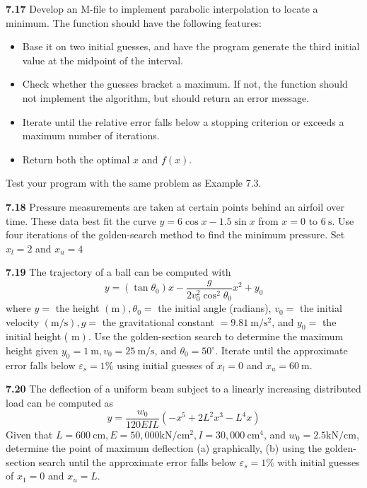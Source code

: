 \documentclass[../main.tex]{subfiles}
\begin{document}
\begin{multicols}{2}
	\noindent \textbf{7.17} Develop an M-file to implement parabolic interpolation to locate a minimum. The function should have the following features:
	\begin{itemize}
		\item Base it on two initial guesses, and have the program generate the third initial value at the midpoint of the interval.
		\item Check whether the guesses bracket a maximum. If not, the function should not implement the algorithm, but should return an error message.
		\item Iterate until the relative error falls below a stopping criterion or exceeds a maximum number of iterations.	
		\item Return both the optimal $x$ and $f(x)$.
	\end{itemize}
	
	\noindent Test your program with the same problem as Example 7.3.
	
	\noindent \textbf{7.18} Pressure measurements are taken at certain points behind an airfoil over time. These data best fit the curve $y=6 \cos x-1.5 \sin x$ from $x=0$ to $6 \mathrm{~s}$. Use four iterations of the golden-search method to find the minimum pressure. Set $x_{l}=2$ and $x_{u}=4$
	
	\noindent \textbf{7.19} The trajectory of a ball can be computed with
	$$
	y=\left(\tan \theta_{0}\right) x-\frac{g}{2 v_{0}^{2} \cos ^{2} \theta_{0}} x^{2}+y_{0}
	$$
	where $y=$ the height $(\mathrm{m}), \theta_{0}=$ the initial angle (radians), $v_{0}=$ the initial velocity $(\mathrm{m} / \mathrm{s}), g=$ the gravitational constant $=9.81 \mathrm{~m} / \mathrm{s}^{2}$, and $y_{0}=$ the initial height ( $\left.\mathrm{m}\right)$. Use the golden-section search to determine the maximum height given $y_{0}=1 \mathrm{~m}, v_{0}=25 \mathrm{~m} / \mathrm{s}$, and $\theta_{0}=50^{\circ}$. Iterate until the approximate error falls below $\varepsilon_{s}=1 \%$ using initial guesses of $x_{l}=0$ and $x_{u}=60 \mathrm{~m}$.
	
	\noindent \textbf{7.20} The deflection of a uniform beam subject to a linearly increasing distributed load can be computed as
	$$
	y=\frac{w_{0}}{120 E I L}\left(-x^{5}+2 L^{2} x^{3}-L^{4} x\right)
	$$
	Given that $L=600 \mathrm{~cm}, E=50,000 \mathrm{kN} / \mathrm{cm}^{2}, I=30,000 \mathrm{~cm}^{4}$, and $w_{0}=2.5 \mathrm{kN} / \mathrm{cm}$, determine the point of maximum deflection (a) graphically, (b) using the golden-section search until the approximate error falls below $\varepsilon_{s}=1 \%$ with initial guesses of $x_{1}=0$ and $x_{u}=L$.
	

\end{multicols}
\end{document}
